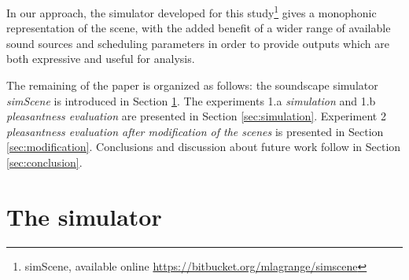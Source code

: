 \documentclass[preprint,12pt]{elsarticle}
\newcommand{\cf}{cf.}
\begin{document}
In our approach, the simulator developed for this study\footnote{simScene, available online \url{https://bitbucket.org/mlagrange/simscene}} gives a monophonic representation of the scene, with the added benefit of a wider range of available sound sources and scheduling parameters in order to provide outputs which are both expressive and useful for analysis.


The remaining of the paper is organized as follows: the soundscape simulator \emph{simScene} is introduced in Section \ref{sec:simulator}. The experiments  1.a \emph{simulation} and  1.b \emph{pleasantness evaluation} are presented in Section \ref{sec:simulation}. Experiment 2 \emph{pleasantness evaluation after modification of the scenes} is presented in Section \ref{sec:modification}. Conclusions and discussion about future work follow in Section \ref{sec:conclusion}.






\section{The simulator}
\label{sec:simulator}

\end{document}
